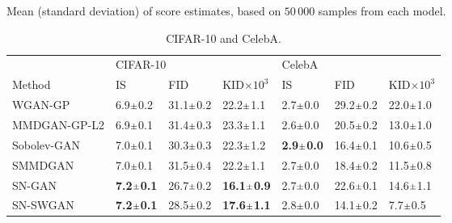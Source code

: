 \documentclass{article}
\begin{document}
\begin{table}[ht]
  \centering
  \caption{Mean (standard deviation) of score estimates, based on $50\,000$ samples from each model.} \label{tab:scores}
  \begin{subtable}[t]{\linewidth}
    \centering
    \caption{CIFAR-10 and CelebA.}
    \label{tab:celebA_cifar10_scores}
    \begin{tabular}{lllllll}
\toprule
{} & \multicolumn{3}{l}{CIFAR-10} & \multicolumn{3}{l}{CelebA} \\
Method &                                    IS &                                    FID &                       KID$\times 10^3$ &                                    IS &                                    FID &                      KID$\times 10^3$ \\
\midrule
WGAN-GP      &             6.9$\mathsmaller{\pm}$0.2 &             31.1$\mathsmaller{\pm}$0.2 &             22.2$\mathsmaller{\pm}$1.1 &             2.7$\mathsmaller{\pm}$0.0 &             29.2$\mathsmaller{\pm}$0.2 &            22.0$\mathsmaller{\pm}$1.0 \\
MMDGAN-GP-L2 &             6.9$\mathsmaller{\pm}$0.1 &             31.4$\mathsmaller{\pm}$0.3 &             23.3$\mathsmaller{\pm}$1.1 &             2.6$\mathsmaller{\pm}$0.0 &             20.5$\mathsmaller{\pm}$0.2 &            13.0$\mathsmaller{\pm}$1.0 \\
Sobolev-GAN  &             7.0$\mathsmaller{\pm}$0.1 &             30.3$\mathsmaller{\pm}$0.3 &             22.3$\mathsmaller{\pm}$1.2 &     \textbf{2.9$\mathsmaller{\pm}$0.0}&             16.4$\mathsmaller{\pm}$0.1 &            10.6$\mathsmaller{\pm}$0.5 \\
SMMDGAN      &             7.0$\mathsmaller{\pm}$0.1 &             31.5$\mathsmaller{\pm}$0.4 &             22.2$\mathsmaller{\pm}$1.1 &             2.7$\mathsmaller{\pm}$0.0 &             18.4$\mathsmaller{\pm}$0.2 &            11.5$\mathsmaller{\pm}$0.8 \\
SN-GAN       &     \textbf{7.2$\mathsmaller{\pm}$0.1}&             26.7$\mathsmaller{\pm}$0.2 &    \textbf{16.1$\mathsmaller{\pm}$0.9} &             2.7$\mathsmaller{\pm}$0.0 &             22.6$\mathsmaller{\pm}$0.1 &            14.6$\mathsmaller{\pm}$1.1 \\
SN-SWGAN     &     \textbf{7.2$\mathsmaller{\pm}$0.1}&             28.5$\mathsmaller{\pm}$0.2 &    \textbf{17.6$\mathsmaller{\pm}$1.1} &             2.8$\mathsmaller{\pm}$0.0 &             14.1$\mathsmaller{\pm}$0.2 &            \phantom{0}7.7$\mathsmaller{\pm}$0.5 \\

\end{tabular}
\end{subtable}
\end{table}
\end{document}
